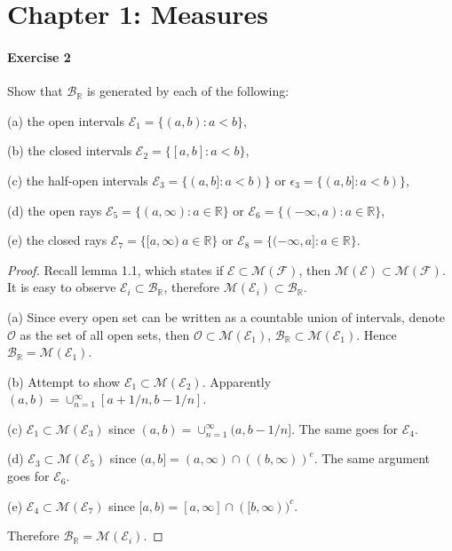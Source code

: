 \section{Chapter 1: Measures}
\paragraph{Exercise 2}
Show that $\mathcal{B}_\mathbb{R}$ is generated by each of the following:
\par(a) the open intervals $\mathcal{E}_1=\{(a,b):a<b\}$,
\par(b) the closed intervals $\mathcal{E}_2=\{[a,b]:a<b\}$,
\par(c) the half-open intervals $\mathcal{E}_3=\{(a,b]:a<b)\}$ or $\epsilon_3=\{(a,b]:a<b)\}$,
\par(d) the open rays $\mathcal{E}_5=\{(a,\infty):a\in\mathbb{R}\}$ or $\mathcal{E}_6=\{(-\infty,a):a\in\mathbb{R}\}$,
\par(e) the closed rays $\mathcal{E}_7=\{[a,\infty)\:a\in\mathbb{R}\}$ or $\mathcal{E}_8=\{(-\infty,a]:a\in\mathbb{R}\}$.
\begin{proof}
    Recall lemma 1.1, which states if $\mathcal{E}\subset\mathcal{M}(\mathcal{F})$, then $\mathcal{M}(\mathcal{E})\subset\mathcal{M}(\mathcal{F})$. It is easy to observe $\mathcal{E}_i\subset\mathcal{B}_\mathbb{R}$, therefore $\mathcal{M}(\mathcal{E}_i)\subset\mathcal{B}_\mathbb{R}$.
    \par(a) Since every open set can be written as a countable union of intervals, denote $\mathcal{O}$ as the set of all open sets, then $\mathcal{O}\subset\mathcal{M}(\mathcal{E}_1)$, $\mathcal{B}_\mathbb{R}\subset\mathcal{M}(\mathcal{E}_1)$. Hence $\mathcal{B}_\mathbb{R}=\mathcal{M}(\mathcal{E}_1)$.
    \par(b) Attempt to show $\mathcal{E}_1\subset\mathcal{M}(\mathcal{E}_2)$. Apparently $(a,b)=\cup_{n=1}^{\infty}[a+1/n,b-1/n]$.
    \par(c) $\mathcal{E}_1\subset\mathcal{M}(\mathcal{E}_3)$ since $(a,b)=\cup_{n=1}^{\infty}(a,b-1/n]$. The same goes for $\mathcal{E}_4$.
    \par(d) $\mathcal{E}_3\subset\mathcal{M}(\mathcal{E}_5)$ since $(a,b]=(a,\infty)\cap((b,\infty))^c$. The same argument goes for $\mathcal{E}_6$.
    \par(e) $\mathcal{E}_4\subset\mathcal{M}(\mathcal{E}_7)$ since $[a,b)=[a,\infty]\cap([b,\infty))^c$.
    \par Therefore $\mathcal{B}_\mathbb{R}=\mathcal{M}(\mathcal{E}_i)$.
\end{proof}
